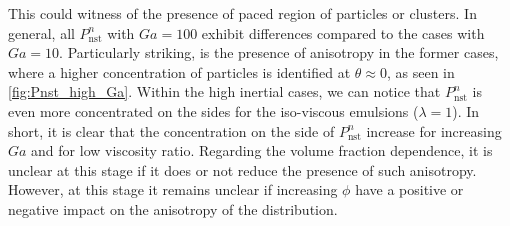 This could witness of the presence of paced region of particles or clusters. 
In general, all $P_\text{nst}^n$ with $Ga = 100$ exhibit differences compared to the cases with $Ga = 10$. 
Particularly striking, is the presence of anisotropy in the former cases, where a higher concentration of particles is identified at $\theta \approx 0$, as seen in \ref{fig:Pnst_high_Ga}.
Within the high inertial cases, we can notice that $P_\text{nst}^n$ is even more concentrated on the sides for the iso-viscous emulsions ($\lambda = 1$). 
In short, it is clear that the concentration on the side of $P_\text{nst}^n$ increase for increasing $Ga$ and for low viscosity ratio. 
Regarding the volume fraction dependence, it is unclear at this stage if it does or not reduce the presence of such anisotropy.
However, at this stage it remains unclear if increasing $\phi$ have a positive or negative impact on the anisotropy of the distribution. 

